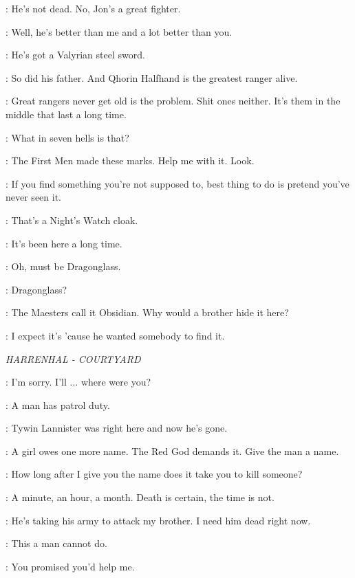 \SAM: He's not dead. No, Jon's a great fighter. 

\GRENN: Well, he's better than me and a lot better than you. 

\SAM: He's got a Valyrian steel sword. 

\GRENN: So did his father. And Qhorin Halfhand is the greatest ranger alive. 

\EDD: Great rangers never get old is the problem. Shit ones neither. It's them in the middle that last a long time. 


\GRENN: What in seven hells is that? 


\SAM: The First Men made these marks. Help me with it.  Look. 

\GRENN: If you find something you're not supposed to, best thing to do is pretend you've never seen it. 

\SAM: That's a Night's Watch cloak. 

\GRENN: It's been here a long time. 

\SAM: Oh, must be Dragonglass. 

\GRENN: Dragonglass? 

\SAM: The Maesters call it Obsidian. Why would a brother hide it here? 

\EDD: I expect it's 'cause he wanted somebody to find it. 

\scene

\textit{HARRENHAL - COURTYARD} 


\ARYA: I'm sorry. I'll $\ldots$ where were you? 

\JAQEN: A man has patrol duty. 

\ARYA: Tywin Lannister was right here and now he's gone. 

\JAQEN: A girl owes one more name. The Red God demands it. Give the man a name. 

\ARYA: How long after I give you the name does it take you to kill someone? 

\JAQEN: A minute, an hour, a month. Death is certain, the time is not. 

\ARYA: He's taking his army to attack my brother. I need him dead right now. 

\JAQEN: This a man cannot do. 

\ARYA: You promised you'd help me. 

